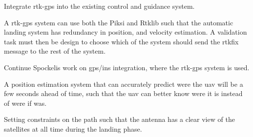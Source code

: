 Integrate \gls{rtk-gps} into the existing control and guidance system.

A \gls{rtk-gps} system can use both the Piksi and Rtklib such that the automatic landing system has redundancy in position, and velocity estimation. A validation task must then be design to choose which of the system should send the rtkfix message to the rest of the system.

Continue Spockelis work on gps/ins integration, where the rtk-gps system is used.

A position estimation system that can accurately predict were the \gls{uav} will be a few seconds ahead of time, such that the \gls{uav} can better know were it is instead of were if was.

Setting constraints on the path such that the antenna has a clear view of the satellites at all time during the landing phase. 
\cleardoublepage